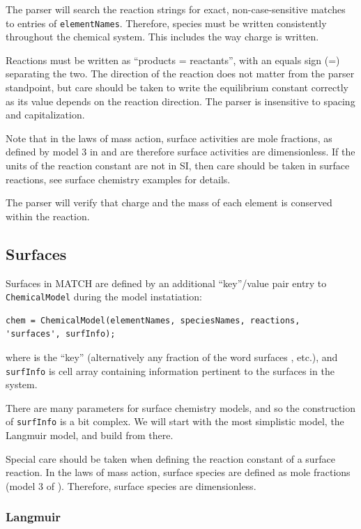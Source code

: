 \documentclass{article}
\begin{document}
The parser will search the reaction strings for exact, non-case-sensitive matches to entries of \verb|elementNames|. Therefore, species must be written consistently throughout the chemical system. This includes the way charge is written. 

Reactions must be written as ``products = reactants'', with an equals sign (=) separating the two. The direction of the reaction does not matter from the parser standpoint, but care should be taken to write the equilibrium constant correctly as its value depends on the reaction direction. The parser is insensitive to spacing and capitalization. 

Note that in the laws of mass action, surface activities are mole fractions, as defined by model 3 in \citet{wang2013} and are therefore surface activities are dimensionless. If the units of the reaction constant are not in SI, then care should be taken in surface reactions, see surface chemistry examples for details. 

The parser will verify that charge and the mass of each element is conserved within the reaction.


\subsection{Surfaces}\label{sec:surfaces}
Surfaces in MATCH are defined by an additional ``key''/value pair entry to \verb|ChemicalModel| during the model instatiation:

\begin{lstlisting}
chem = ChemicalModel(elementNames, speciesNames, reactions, 'surfaces', surfInfo);
\end{lstlisting}
where  is the ``key'' (alternatively any fraction of the word surfaces ,  etc.), and \verb|surfInfo| is cell array containing information pertinent to the surfaces in the system. 

There are many parameters for surface chemistry models, and so the construction of \verb|surfInfo| is a bit complex. We will start with the most simplistic model, the Langmuir model, and build from there.

Special care should be taken when defining the reaction constant of a surface reaction. In the laws of mass action, surface species are defined as mole fractions (model 3 of \citet{wang2013}). Therefore, surface species are dimensionless.

\subsubsection{Langmuir}
\end{document}
